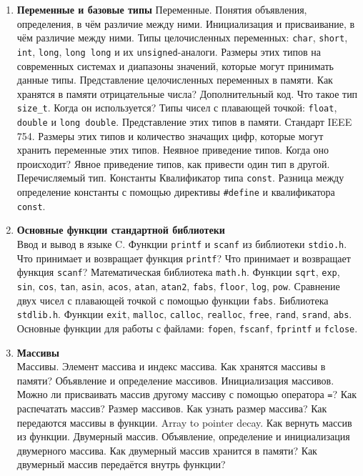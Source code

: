 \documentclass{article}
\begin{document}
\begin{enumerate}
\item \textbf{Переменные и базовые типы}
Переменные. Понятия объявления, определения, в чём различие между ними. Инициализация и присваивание, в чём различие между ними. Типы целочисленных переменных: \texttt{char}, \texttt{short}, \texttt{int}, \texttt{long}, \texttt{long long} и их \texttt{unsigned}-аналоги. Размеры этих типов на современных системах и диапазоны значений, которые могут принимать данные типы. Представление целочисленных переменных в памяти. Как хранятся в памяти отрицательные числа? Дополнительный код. Что такое тип \texttt{size\_t}. Когда он используется? Типы чисел с плавающей точкой: \texttt{float}, \texttt{double} и \texttt{long double}. Представление этих типов в памяти. Стандарт IEEE 754. Размеры этих типов и количество значащих цифр, которые могут хранить переменные этих типов. Неявное приведение типов. Когда оно происходит? Явное приведение типов, как привести один тип в другой. Перечисляемый тип. Константы Квалификатор типа \texttt{const}. Разница между определение константы с помощью директивы \texttt{\#define} и квалификатора \texttt{const}.


\item \textbf{Основные функции стандартной библиотеки}\\
Ввод и вывод в языке C. Функции \texttt{printf} и \texttt{scanf} из библиотеки \texttt{stdio.h}. Что принимает и возвращает функция \texttt{printf}? Что принимает и возвращает функция \texttt{scanf}? Математическая библиотека \texttt{math.h}. Функции \texttt{sqrt}, \texttt{exp}, \texttt{sin}, \texttt{cos}, \texttt{tan}, \texttt{asin}, \texttt{acos}, \texttt{atan}, \texttt{atan2}, \texttt{fabs}, \texttt{floor}, \texttt{log}, \texttt{pow}. Сравнение двух чисел с плавающей точкой с помощью функции \texttt{fabs}. Библиотека \texttt{stdlib.h}. Функции \texttt{exit}, \texttt{malloc}, \texttt{calloc}, \texttt{realloc}, \texttt{free}, \texttt{rand}, \texttt{srand}, \texttt{abs}. Основные функции для работы с файлами: \texttt{fopen}, \texttt{fscanf}, \texttt{fprintf} и \texttt{fclose}.

\item \textbf{Массивы}\\
Массивы. Элемент массива и индекс массива. Как хранятся массивы в памяти? Объявление и определение массивов. Инициализация массивов. Можно ли присваивать массив другому массиву с помощью оператора \texttt{=}? Как распечатать массив? Размер массивов. Как узнать размер массива? Как передаются массивы в функции. Array to pointer decay. Как вернуть массив из функции. Двумерный массив. Объявление, определение и инициализация двумерного массива. Как двумерный массив хранится в памяти? Как двумерный массив передаётся внутрь функции?



\end{enumerate}
\end{document}
